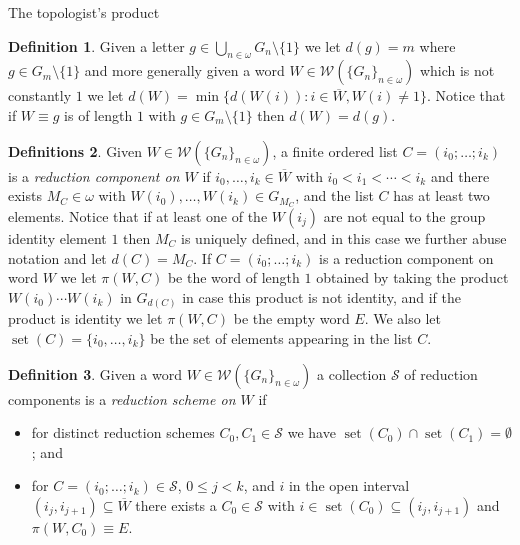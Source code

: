 \documentclass{amsart}
\theoremstyle{definition}\newtheorem{theorem}{Theorem}
\theoremstyle{definition}\newtheorem*{A}{Main Theorem}
\theoremstyle{definition}\newtheorem*{B}{Theorem \ref{elementaryequiv}}
\theoremstyle{definition}\newtheorem*{C}{Theorem \ref{continuous}}
\theoremstyle{definition}\newtheorem*{D}{Theorem \ref{bigisomorphism2}}
\theoremstyle{definition}\newtheorem{bigtheorem}{Main Theorem}
\numberwithin{theorem}{section}
\theoremstyle{definition}\newtheorem{corollary}[theorem]{Corollary}
\theoremstyle{definition}\newtheorem{proposition}[theorem]{Proposition}
\theoremstyle{definition}\newtheorem{definition}[theorem]{Definition}
\theoremstyle{definition}\newtheorem{question}[theorem]{Question}
\theoremstyle{definition}\newtheorem{example}[theorem]{Example}
\theoremstyle{definition}\newtheorem{remark}[theorem]{Remark}
\theoremstyle{definition}\newtheorem{note}[theorem]{Note}
\theoremstyle{definition}\newtheorem{lemma}[theorem]{Lemma}
\theoremstyle{definition}\newtheorem{fact}[theorem]{Fact}
\theoremstyle{definition}\newtheorem{define}[theorem]{Definition}
\theoremstyle{definition}\newtheorem{claim}[theorem]{Claim}
\theoremstyle{definition}\newtheorem{obs}[theorem]{Observation}
\theoremstyle{definition}\newtheorem{definitions}[theorem]{Definitions}
\newcommand{\set}{\operatorname{set}}
\newcommand{\W}{\mathcal{W}}
\begin{document}
\begin{section}{The topologist's product}
\begin{definition}  Given a letter $g \in \bigcup_{n \in \omega} G_n \setminus \{1\}$ we let $d(g) = m$ where $g\in G_m \setminus \{1\}$ and more generally given a word $W \in \W(\{G_n\}_{n \in \omega})$ which is not constantly $1$ we let $d(W)=
\min\{d(W(i)): i \in \overline{W}, W(i) \neq 1\}$.  Notice that if $W \equiv g$ is of length $1$ with $g \in G_m \setminus \{1\}$ then $d(W) = d(g)$.
\end{definition}

\begin{definitions}  Given $W \in \W(\{G_n\}_{n \in \omega})$, a finite ordered list $C = (i_0; \ldots; i_k)$ is a \emph{reduction component on $W$} if $i_0, \ldots, i_k \in \overline{W}$ with $i_0 < i_1 < \cdots < i_k$ and there exists $M_C \in \omega$ with $W(i_0), \ldots, W(i_k) \in G_{M_C}$, and the list $C$ has at least two elements.  Notice that if at least one of the $W(i_j)$ are not equal to the group identity element $1$ then $M_C$ is uniquely defined, and in this case we further abuse notation and let $d(C) = M_C$.  If $C = (i_0; \ldots; i_k)$ is a reduction component on word $W$ we let $\pi(W, C)$ be the word of length $1$ obtained by taking the product $W(i_0)\cdots W(i_k)$ in $G_{d(C)}$ in case this product is not identity, and if the product is identity we let $\pi(W, C)$ be the empty word $E$.  We also let $\set(C) = \{i_0, \ldots, i_k\}$ be the set of elements appearing in the list $C$.

\end{definitions}

\begin{definition}\label{redschdef}  Given a word $W \in \W(\{G_n\}_{n\in \omega})$ a collection $\mathcal{S}$ of reduction components is a \emph{reduction scheme on $W$} if

\begin{itemize}

\item for distinct reduction schemes $C_0, C_1 \in \mathcal{S}$ we have $\set(C_0) \cap \set(C_1) = \emptyset$; and

\item for $C = (i_0; \ldots; i_k) \in \mathcal{S}$, $0 \leq j < k$, and $i$ in the open interval $(i_j, i_{j+1}) \subseteq \overline{W}$ there exists a $C_0 \in \mathcal{S}$ with $i \in \set(C_0) \subseteq (i_j, i_{j+1})$ and $\pi(W, C_0) \equiv E$.
\end{itemize}

\end{definition}



\end{section}
\end{document}
